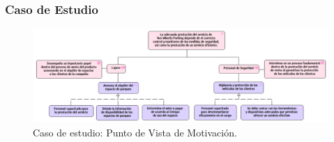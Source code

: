 \subsubsection{Caso de Estudio}


\begin{figure}[h]
	\centering
	\includegraphics[width=1.0\textwidth]{imagenes/Caso_Estudio/Motivacion/Motivacion.PDF}
	\caption{Caso de estudio: Punto de Vista de Motivación.}
	\label{fig:gap_analysis}
\end{figure}


